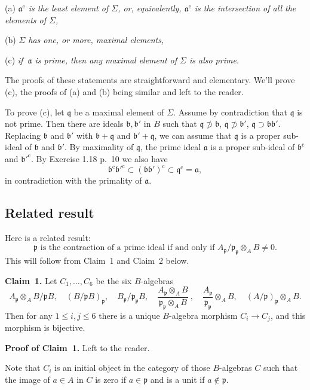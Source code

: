 \documentclass[parskip=half,fontsize=12pt]{scrartcl}%
\newcommand{\oo}{\operatorname}\newcommand{\ooo}{\operatorname*}
\newcommand{\mf}{\mathfrak}
\newcommand{\aaa}{\mf a}
\newcommand{\bbb}{\mf b}
\newcommand{\ppp}{\mf p}
\newcommand{\qqq}{\mf q}
\begin{document}
(a) \emph{$\aaa^{\oo e}$ is the least element of $\Sigma$, or, equivalently, $\aaa^{\oo e}$ is the intersection of all the elements of $\Sigma$,}

(b) \emph{$\Sigma$ has one, or more, maximal elements,}

(c) \emph{if $\ \aaa$ is prime, then any maximal element of $\Sigma$ is also prime.}

The proofs of these statements are straightforward and elementary. We'll prove (c), the proofs of (a) and (b) being similar and left to the reader.

To prove (c), let $\qqq$ be a maximal element of $\Sigma$. Assume by contradiction that $\qqq$ is not prime. Then there are ideals $\mf{b,b}'$ in $B$ such that $\qqq\not\supset\bbb$, $\qqq\not\supset\bbb'$, $\qqq\supset\mf{bb}'$. Replacing $\bbb$ and $\bbb'$ with $\bbb+\qqq$ and $\bbb'+\qqq$, we can assume that $\qqq$ is a proper sub-ideal of $\bbb$ and $\bbb'$. By maximality of $\qqq$, the prime ideal $\aaa$ is a proper sub-ideal of $\bbb^{\oo c}$ and $\bbb'^{\oo c}$. By Exercise 1.18 p.~10 we also have 
$$
\bbb^{\oo c}\bbb'^{\oo c}\subset(\mf{bb}')^{\oo c}\subset\qqq^{\oo c}=\aaa,
$$ 
in contradiction with the primality of $\aaa$.

\subsection{Related result}\label{res}%

Here is a related result:
\begin{equation}\label{fiber1}
\ppp\text{ is the contraction of a prime ideal if and only if }A_\ppp/\ppp_\ppp\otimes_AB\ne0.
\end{equation}
This will follow from Claim~1 and Claim~2 below.

\textbf{Claim~1.} Let $C_1,\ldots,C_6$ be the six $B$-algebras 
$$
A_\ppp\otimes_AB/\ppp B,\quad (B/\ppp B)_\ppp,\quad B_\ppp/\ppp_\ppp B,\quad  
\frac{A_\ppp\otimes_AB}{\ppp_\ppp\otimes_AB}\ ,\quad \frac{A_\ppp}{\ppp_\ppp}\otimes_AB,\quad (A/\ppp)_\ppp\otimes_AB.
$$ 
Then for any $1\le i,j\le6$ there is a unique $B$-algebra morphism $C_i\to C_j$, and this morphism is bijective.

\textbf{Proof of Claim~1.} Left to the reader. 

Note that $C_i$ is an initial object in the category of those $B$-algebras $C$ such that the image of $a\in A$ in $C$ is zero if $a\in\ppp$ and is a unit if $a\notin\ppp$. 
\end{document}
